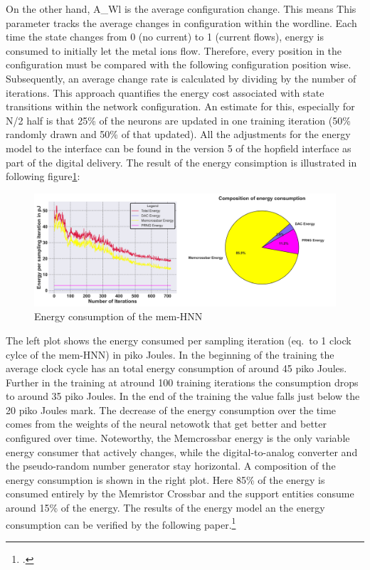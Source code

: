 On the other hand, A\_Wl is the average configuration change.
This means This parameter tracks the average changes in configuration within the wordline.
Each time the state changes from 0 (no current) to 1 (current flows), energy is consumed to initially let the metal ions flow.
Therefore, every position in the configuration must be compared with the following configuration position wise.
Subsequently, an average change rate is calculated by dividing by the number of iterations.
This approach quantifies the energy cost associated with state transitions within the network configuration.
An estimate for this, especially for N/2 half is that 25\% of the neurons are updated in one training iteration (50\% randomly drawn and 50\% of that updated).
All the adjustments for the energy model to the interface can be found in the version 5 of the hopfield interface as part of the digital delivery.
The result of the energy consimption is illustrated in following figure\ref{Energy output_2}:
\begin{figure}[H]
    \centering
    \includegraphics[width=1\linewidth]{graphics/energy_and_averages_plot_4.png}
    \caption{Energy consumption of the \ac{mem-HNN}}
    \label{Energy output_2}
\end{figure}
The left plot shows the energy consumed per sampling iteration (eq.\ to 1 clock cylce of the \ac{mem-HNN}) in piko Joules.
In the beginning of the training the average clock cycle has an total energy consumption of around 45 piko Joules.
Further in the training at atround 100 training iterations the consumption drops to around 35 piko Joules. 
In the end of the training the value falls just below the 20 piko Joules mark. 
The decrease of the energy consumption over the time comes from the weights of the neural netowotk that get better and better configured over time.
Noteworthy, the Memcrossbar energy is the only variable energy consumer that actively changes, while the digital-to-analog converter and the pseudo-random number generator stay horizontal.
A composition of the energy consumption is shown in the right plot.
Here 85\% of the energy is consumed entirely by the Memristor Crossbar and the support entities consume around 15\% of the energy.
The results of the energy model an the energy consumption can be verified by the following paper.\footcite[cf.][4]{hizzaniMemristorbasedHardwareAlgorithms2023}

